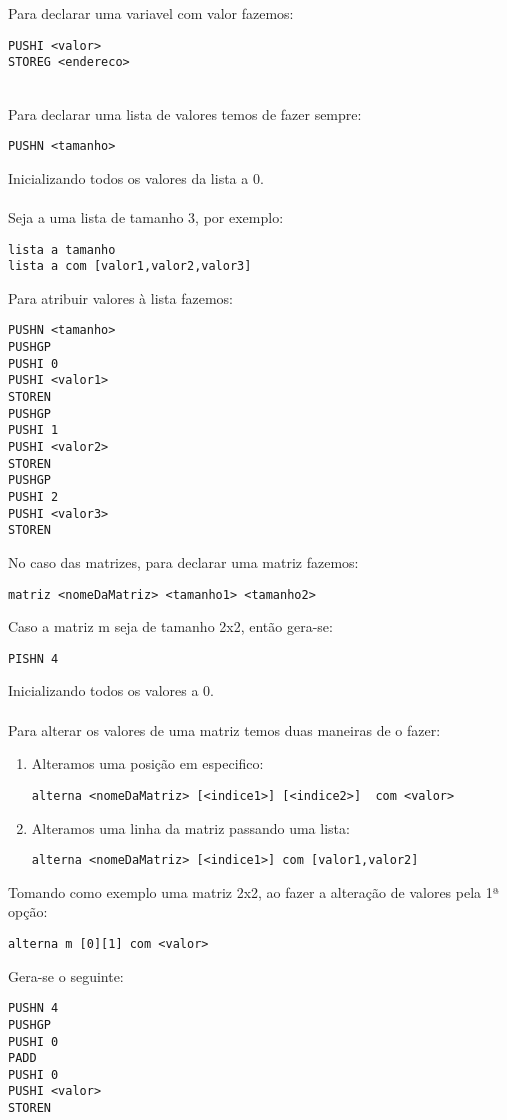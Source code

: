 \documentclass[11pt,a4paper]{report}%
\begin{document}
Para declarar uma variavel com valor fazemos:
\begin{lstlisting}
PUSHI <valor>
STOREG <endereco>
\end{lstlisting}
\\
Para declarar uma lista de valores temos de fazer sempre:
\begin{lstlisting}
PUSHN <tamanho>
\end{lstlisting}
Inicializando todos os valores da lista a 0.\\ \\
Seja a uma lista de tamanho 3, por exemplo:
\begin{lstlisting}
lista a tamanho
lista a com [valor1,valor2,valor3]
\end{lstlisting}
Para atribuir valores à lista fazemos:
\begin{lstlisting}
PUSHN <tamanho>
PUSHGP
PUSHI 0
PUSHI <valor1>
STOREN
PUSHGP
PUSHI 1
PUSHI <valor2>
STOREN
PUSHGP
PUSHI 2
PUSHI <valor3>
STOREN 
\end{lstlisting}


No caso das matrizes, para declarar uma matriz fazemos: 
\begin{lstlisting}
matriz <nomeDaMatriz> <tamanho1> <tamanho2>    
\end{lstlisting}
Caso a matriz m seja de tamanho 2x2, então gera-se:
\begin{lstlisting}
PISHN 4
\end{lstlisting}
Inicializando todos os valores a 0. \\ \\

Para alterar os valores de uma matriz temos duas maneiras de o fazer:
\begin{enumerate}
\item Alteramos uma posição em especifico:
\begin{lstlisting}
alterna <nomeDaMatriz> [<indice1>] [<indice2>]  com <valor>    
\end{lstlisting}
\item Alteramos uma linha da matriz passando uma lista:
\begin{lstlisting}
alterna <nomeDaMatriz> [<indice1>] com [valor1,valor2]
\end{lstlisting}
\end{enumerate}

Tomando como exemplo uma matriz 2x2, ao fazer a alteração de valores pela 1ª opção:
\begin{lstlisting}
alterna m [0][1] com <valor>
\end{lstlisting}
Gera-se o seguinte:
\begin{lstlisting}
PUSHN 4
PUSHGP
PUSHI 0
PADD
PUSHI 0
PUSHI <valor>
STOREN
\end{lstlisting}
\end{document}
